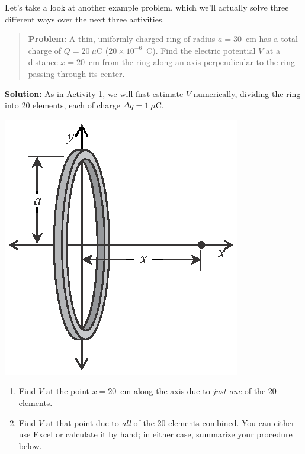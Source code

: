 \begin{minipage}{0.65\textwidth}
Let's take a look at another example problem, which we'll actually solve three different ways over the next three activities.  

\begin{quote}
\textbf{Problem:} A thin, uniformly charged ring of radius $a=30$~cm has a total charge of $Q = 20\ \mu$C ($20
\times 10^{-6}$~C). Find the electric potential $V$ at a distance $x = 20$~cm from the ring along an axis perpendicular to the ring passing through its center.
\end{quote}

\textbf{Solution:} As in Activity 1, we will first estimate $V$ numerically, dividing the ring into 20 elements, each of charge $\Delta q = 1\ \mu$C.

\end{minipage}
\begin{minipage}{0.34\textwidth}
\vspace{-0.3in}
\raggedleft \includegraphics[scale=0.9]{potential_charge_distributions/ring_integral.eps}
\end{minipage}

\begin{enumerate}[wide, label=(\emph{\alph*})]

\item Find $V$ at the point $x = 20$~cm along the axis due to \textit{just one} of the 20 elements.
\answerspace{0.4in}

\item Find $V$ at that point due to \textit{all} of the 20 elements combined.  You can either use Excel or calculate it by hand; in either case, summarize your procedure below.
\answerspace{0.7in}

\end{enumerate}

